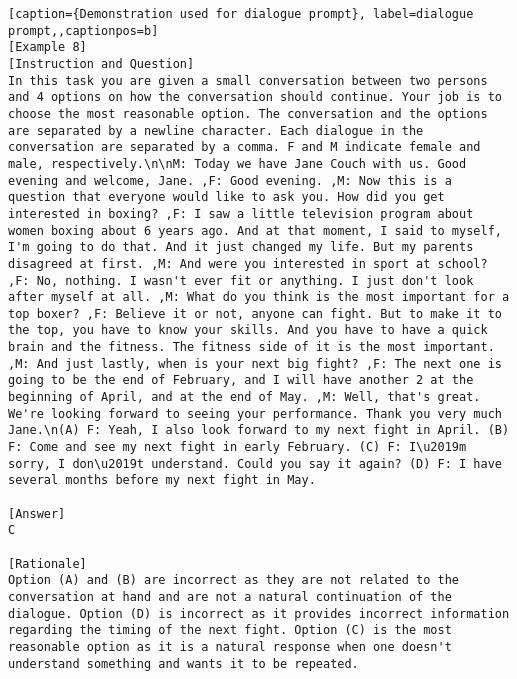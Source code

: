 \begin{lstlisting}[caption={Demonstration used for dialogue prompt}, label=dialogue prompt,,captionpos=b]
[Example 8]
[Instruction and Question]
In this task you are given a small conversation between two persons and 4 options on how the conversation should continue. Your job is to choose the most reasonable option. The conversation and the options are separated by a newline character. Each dialogue in the conversation are separated by a comma. F and M indicate female and male, respectively.\n\nM: Today we have Jane Couch with us. Good evening and welcome, Jane. ,F: Good evening. ,M: Now this is a question that everyone would like to ask you. How did you get interested in boxing? ,F: I saw a little television program about women boxing about 6 years ago. And at that moment, I said to myself, I'm going to do that. And it just changed my life. But my parents disagreed at first. ,M: And were you interested in sport at school? ,F: No, nothing. I wasn't ever fit or anything. I just don't look after myself at all. ,M: What do you think is the most important for a top boxer? ,F: Believe it or not, anyone can fight. But to make it to the top, you have to know your skills. And you have to have a quick brain and the fitness. The fitness side of it is the most important. ,M: And just lastly, when is your next big fight? ,F: The next one is going to be the end of February, and I will have another 2 at the beginning of April, and at the end of May. ,M: Well, that's great. We're looking forward to seeing your performance. Thank you very much Jane.\n(A) F: Yeah, I also look forward to my next fight in April. (B) F: Come and see my next fight in early February. (C) F: I\u2019m sorry, I don\u2019t understand. Could you say it again? (D) F: I have several months before my next fight in May.

[Answer]
C

[Rationale]
Option (A) and (B) are incorrect as they are not related to the conversation at hand and are not a natural continuation of the dialogue. Option (D) is incorrect as it provides incorrect information regarding the timing of the next fight. Option (C) is the most reasonable option as it is a natural response when one doesn't understand something and wants it to be repeated.




\end{lstlisting}
